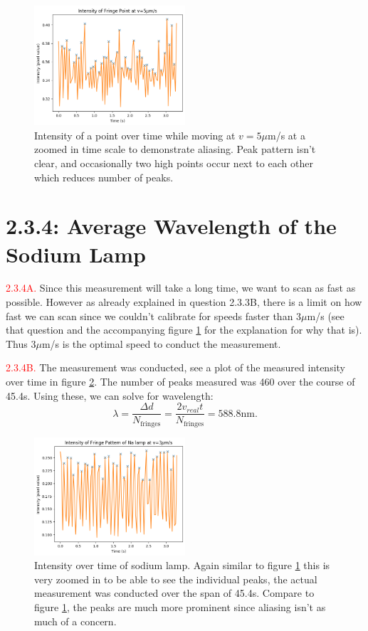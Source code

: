 \documentclass[letterpaper, reqno,11pt]{article}
\begin{document}
\begin{figure}[htpb]
    \centering
    \includegraphics[width=0.5\textwidth]{3B}
    \caption{Intensity of a point over time while moving at $v=5\mu$m/s at a zoomed in time scale to demonstrate aliasing. Peak pattern isn't clear, and occasionally two high points occur next to each other which reduces number of peaks.}
    \label{fig:3B}
\end{figure}

\section{2.3.4: Average Wavelength of the Sodium Lamp}

\noindent \textcolor{red}{2.3.4A.} Since this measurement will take a long time, we want to scan as fast as possible. However as already explained in question 2.3.3B, there is a limit on how fast we can scan since we couldn't calibrate for speeds faster than $3\mu$m/s (see that question and the accompanying figure \ref{fig:3B} for the explanation for why that is). Thus $3\mu$m/s is the optimal speed to conduct the measurement.

\noindent \textcolor{red}{2.3.4B.} The measurement was conducted, see a plot of the measured intensity over time in figure \ref{fig:4B}. The number of peaks measured was 460 over the course of 45.4s. Using these, we can solve for wavelength:
\[
    \lambda = \frac{\Delta d}{N_{\text{fringes}}}=\frac{2v_{real}t}{N_{\text{fringes}}}=588.8\text{nm}
.\]

\begin{figure}[htpb]
    \centering
    \includegraphics[width=0.5\textwidth]{4B}
    \caption{Intensity over time of sodium lamp. Again similar to figure \ref{fig:3B} this is very zoomed in to be able to see the individual peaks, the actual measurement was conducted over the span of 45.4s. Compare to figure \ref{fig:3B}, the peaks are much more prominent since aliasing isn't as much of a concern.}
    \label{fig:4B}
\end{figure}
\end{document}

